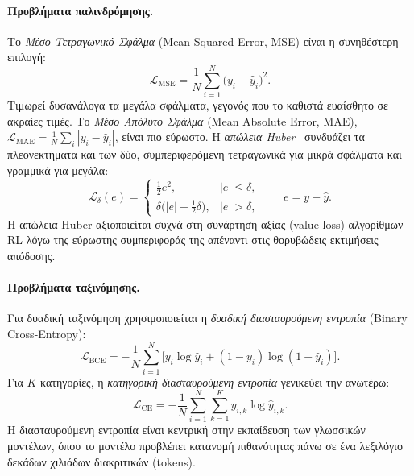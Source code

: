 \paragraph{Προβλήματα παλινδρόμησης.}
Το \emph{Μέσο Τετραγωνικό Σφάλμα} (Mean Squared
Error, MSE) είναι η συνηθέστερη επιλογή:
\begin{equation}
    \mathcal{L}_{\mathrm{MSE}}
    = \frac{1}{N}\sum_{i=1}^{N}\big(y_i - \hat{y}_i\big)^2.
    \label{eq:mse}
\end{equation}
Τιμωρεί δυσανάλογα τα μεγάλα σφάλματα, γεγονός που το καθιστά ευαίσθητο σε
ακραίες τιμές. Το \emph{Μέσο Απόλυτο Σφάλμα}
(Mean Absolute Error, MAE),
$\mathcal{L}_{\mathrm{MAE}} = \frac{1}{N}\sum_i |y_i - \hat{y}_i|$, είναι πιο
εύρωστο. Η \emph{απώλεια Huber}~\cite{huber1964robust} συνδυάζει τα
πλεονεκτήματα και των δύο, συμπεριφερόμενη τετραγωνικά για μικρά σφάλματα και
γραμμικά για μεγάλα:
\begin{equation}
    \mathcal{L}_{\delta}(e) =
    \begin{cases}
        \tfrac{1}{2}e^2, & |e| \le \delta,\\[4pt]
        \delta\big(|e| - \tfrac{1}{2}\delta\big), & |e| > \delta,
    \end{cases}
    \qquad e = y - \hat{y}.
    \label{eq:huber}
\end{equation}
Η απώλεια Huber αξιοποιείται συχνά στη συνάρτηση
αξίας (value loss) αλγορίθμων RL λόγω της
εύρωστης συμπεριφοράς της απέναντι στις θορυβώδεις εκτιμήσεις απόδοσης.

\paragraph{Προβλήματα ταξινόμησης.}
Για δυαδική ταξινόμηση χρησιμοποιείται η \emph{δυαδική διασταυρούμενη
εντροπία} (Binary Cross-Entropy):
\begin{equation}
    \mathcal{L}_{\mathrm{BCE}}
    = -\frac{1}{N}\sum_{i=1}^{N}\Big[
        y_i \log \hat{y}_i + (1-y_i)\log(1-\hat{y}_i)
    \Big].
    \label{eq:bce}
\end{equation}
Για $K$ κατηγορίες, η \emph{κατηγορική διασταυρούμενη εντροπία} γενικεύει την
ανωτέρω:
\begin{equation}
    \mathcal{L}_{\mathrm{CE}}
    = -\frac{1}{N}\sum_{i=1}^{N}\sum_{k=1}^{K}
        y_{i,k} \log \hat{y}_{i,k}.
    \label{eq:ce}
\end{equation}
Η διασταυρούμενη εντροπία είναι κεντρική στην εκπαίδευση των γλωσσικών
μοντέλων, όπου το μοντέλο προβλέπει κατανομή πιθανότητας πάνω σε ένα λεξιλόγιο
δεκάδων χιλιάδων διακριτικών (tokens).


